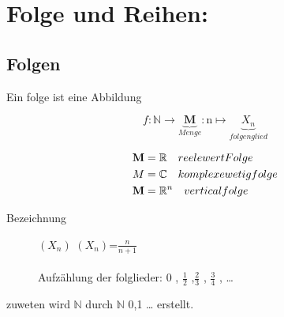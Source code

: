
\chapter{Folge und Reihen:}
\section{Folgen}
\begin{definition}[Folgen]
    Ein folge ist eine Abbildung

    \[ f: \mathbb{N} \rightarrow \underbrace{\mathbf{M}}_{Menge} : \mathrm{n} \mapsto \underbrace{X_n}_{folgenglied} \]

\end{definition}
\begin{remark}

    \begin{align}	\mathbf{M} &= \mathbb{R} \quad reelewert Folge  \notag \\
    M&= \mathbb{C} \quad	 komplexewetig folge  \notag \\
    \mathbf{M}&= \mathbb{R}^n \quad vertical folge \notag
    \end{align}




\end{remark}
\begin{description}

    \item[Bezeichnung]

    \quad $(X_n)$ \space {} \space $ \left( X_n   \right)$=$ \frac{n}{n+1} $
    \\ \\ Aufzählung der folglieder: 0 , $\frac{1}{2}$ ,$\frac{2}{3}$ , $\frac{3}{4}$ , \dots

\end{description}
\begin{remark}
    zuweten wird $\mathbb{N}$ durch $\mathbb{N}$ {0,1 \dots} erstellt.


\end{remark}
